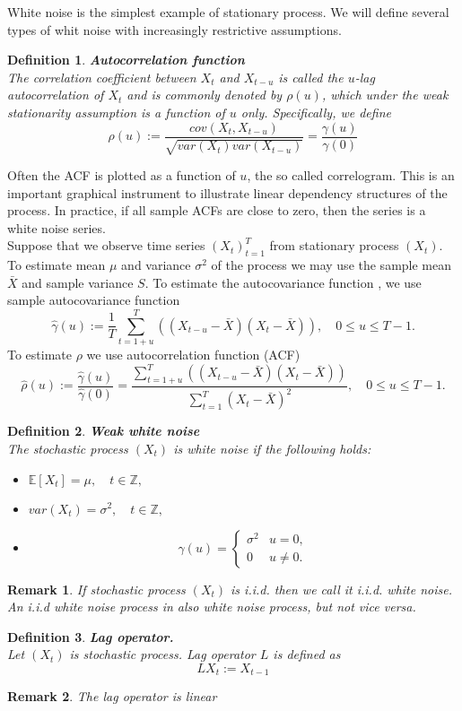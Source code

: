 \documentclass{book}
\newtheorem{definition}{Definition}[section]
\newtheorem{remark}{Remark}[section]
\begin{document}
White noise is the simplest example of stationary process. We will define several types of whit noise with increasingly restrictive assumptions.
\begin{definition}\textbf{Autocorrelation function}\\
The correlation coefficient between $X_{t}$ and $X_{t-u}$ is called the $u$-lag autocorrelation of $X_{t}$ and is commonly denoted by $\rho(u)$, which under the weak stationarity assumption is a function of $u$ only. Specifically, we define
$$
\rho(u):=\frac{cov(X_{t},X_{t-u})}{\sqrt{var(X_{t})var(X_{t-u})}}=\frac{\gamma(u)}{\gamma(0)}
$$
\end{definition}
Often the ACF is plotted as a function of $u$, the so called correlogram. This is an important graphical instrument to illustrate linear dependency structures of the process. In practice, if all sample ACFs are close to zero, then the series is a white noise series.\\
Suppose that we observe time series $(X_{t})_{t=1}^{T}$ from stationary process $(X_{t})$. To estimate mean $\mu$ and variance $\sigma^{2}$ of the process we may use the sample mean $\bar{X}$ and sample variance $S$. To estimate the autocovariance function , we use sample autocovariance function
$$
\hat{\gamma}(u):=\frac{1}{T}\sum_{t=1+u}^{T}((X_{t-u}-\bar{X})(X_{t}-\bar{X})),\quad 0\leq u\leq T-1.
$$
To estimate $\rho$ we use autocorrelation function (ACF)
$$
\hat{\rho}(u):=\frac{\hat{\gamma}(u)}{\hat{\gamma}(0)}=\frac{\sum_{t=1+u}^{T}((X_{t-u}-\bar{X})(X_{t}-\bar{X}))}{\sum_{t=1}^{T}(X_{t}-\bar{X})^{2}},\quad 0\leq u\leq T-1.
$$ 
\begin{definition}\textbf{Weak white noise}\\
The stochastic process $(X_{t})$ is white noise if the following holds:
\begin{itemize}
\item $\mathbb{E}[X_{t}]=\mu,\quad t\in\mathbb{Z},$
\item $var(X_{t})=\sigma^{2},\quad t\in\mathbb{Z},$
\item 
$$
\gamma(u)=\left\{\begin{array}{cc}
\sigma^{2}&u=0,\\
0&u\neq 0.
\end{array}\right.
$$
\end{itemize}
\end{definition}
\begin{remark}
If stochastic process $(X_{t})$ is i.i.d. then we call it i.i.d. white noise. An i.i.d white noise process in also white noise process, but not vice versa.
\end{remark}
\begin{definition}\textbf{Lag operator.}\\
Let $(X_{t})$ is stochastic process. Lag operator $L$ is defined as 
$$
LX_{t}:=X_{t-1}
$$
\end{definition}
\begin{remark}
The lag operator is linear
\end{remark}
\end{document}
